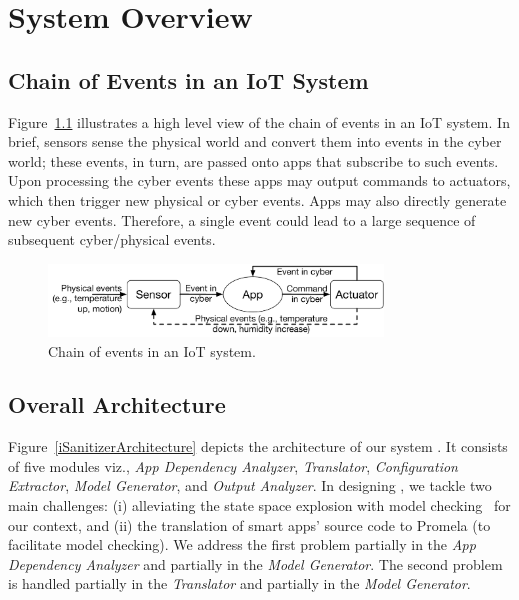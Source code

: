 \chapter{System Overview}\label{overview}
\section{Chain of Events in an IoT System}
Figure~\ref{chainreaction} illustrates a high level view of the chain of events in an IoT system.
In brief, sensors sense the physical world and convert them into events in the cyber world;
these events, in turn, are passed onto apps that subscribe to such events.
Upon processing the cyber events these apps may
output commands to actuators, which
then trigger new physical or cyber events.
Apps may also directly generate new cyber events.
Therefore, a single event could lead to a large sequence of subsequent cyber/physical events.

\begin{figure}[tb]
\begin{center}
\includegraphics[width=3.5in]{chainreaction}
\caption{Chain of events in an IoT system.}
\label{chainreaction}
\end{center}
\end{figure}


\section{Overall Architecture}
Figure~\ref{iSanitizerArchitecture} depicts the architecture of our system \sys.
It consists of five modules viz.,
\textit{App Dependency Analyzer}, \textit{Translator}, \textit{Configuration Extractor}, \textit{Model Generator}, and \textit{Output Analyzer}.
In designing \sys, we tackle two main challenges:
(i) alleviating the state space explosion with model checking~\cite{Clarke2012} for our context, and
(ii) the translation of smart apps' source code to Promela (to facilitate model checking).
We address the first problem partially in the \textit{App Dependency Analyzer}
and partially in the \textit{Model Generator}.
The second problem is handled partially in the \textit{Translator}
and partially in the \textit{Model Generator}.

